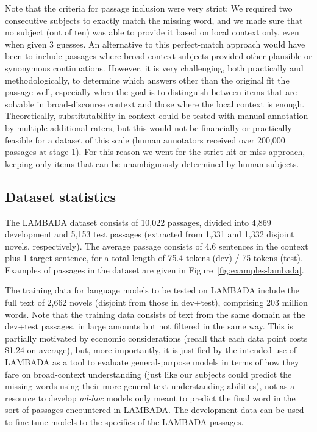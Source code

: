 Note that the criteria for passage inclusion were very strict: We required two consecutive subjects to exactly match the missing word, and we made sure that no subject (out of ten) was able to provide it based on local context only, even when given 3 guesses.  An alternative to this perfect-match approach would have been to include passages where broad-context subjects provided other plausible or synonymous continuations.  However, it is very challenging, both practically and methodologically, to determine which answers other than the original fit the passage well, especially when the goal is to distinguish between items that are solvable in broad-discourse context and those where the local context is enough. Theoretically, substitutability in context could be tested with manual annotation by multiple additional raters, but this would not be financially or practically feasible for a dataset of this scale (human annotators received over 200,000 passages at stage 1). For this reason we went for the strict hit-or-miss approach, keeping only items that can be unambiguously determined by human subjects.

\subsection{Dataset statistics}
\label{sec:dataset-statistics}

The LAMBADA dataset consists of 10,022 passages, divided into 4,869 development and 5,153 test passages (extracted from 1,331 and 1,332 disjoint novels, respectively). The average passage consists of 4.6 sentences in the context plus 1 target sentence, for a total length of 75.4 tokens (dev) / 75 tokens (test). Examples of passages in the dataset are given in
Figure~\ref{fig:examples-lambada}.

The training data for language models to be tested on LAMBADA include the full text of 2,662 novels (disjoint from those in dev+test), comprising 203 million words. Note that the training data consists of text from the same domain as the dev+test passages, in large amounts but not filtered in the same way. This is partially motivated by economic considerations (recall that each data point costs \$1.24 on average), but, more importantly, it is justified by the intended use of LAMBADA as a tool to evaluate general-purpose models in terms of how they fare on broad-context understanding (just like our subjects could predict the missing words using their more general text understanding abilities), not as a resource to develop \emph{ad-hoc} models only meant to predict the final word in the sort of passages encountered in LAMBADA. The development data can be used to fine-tune models to the specifics of the LAMBADA passages.

